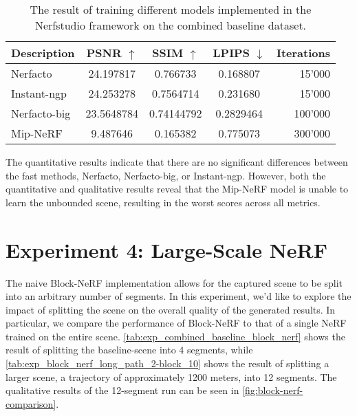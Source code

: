 \begin{table}[ht]
\centering
\setlength{\tabcolsep}{6pt}
\renewcommand{\arraystretch}{1.5}
\begin{tabular}{l | C{2.2} C{1.3} C{1.3} | r}
\hline
\textbf{Description} & \textbf{PSNR $\uparrow$} & \textbf{SSIM $\uparrow$} & \textbf{LPIPS $\downarrow$} & \textbf{Iterations} \\
\hline
Nerfacto        & 24.197817                     & 0.766733     & 0.168807 & 15'000 \\
Instant-ngp     & 24.253278   & 0.7564714                     & 0.231680 & 15'000 \\
Nerfacto-big    & 23.5648784     & 0.74144792     & 0.2829464 & 100'000 \\
Mip-NeRF        & 9.487646 & 0.165382 & 0.775073 & 300'000 \\
\hline
\end{tabular}
\caption[Results for experiment 3: Different models]{The result of training different models implemented in the Nerfstudio framework on the combined baseline dataset.}
\label{tab:different-models}
\end{table}



The quantitative results indicate that there are no significant differences between the fast methods, Nerfacto, Nerfacto-big, or Instant-ngp. However, both the quantitative and qualitative results reveal that the Mip-NeRF model is unable to learn the unbounded scene, resulting in the worst scores across all metrics.









\section{Experiment 4: Large-Scale NeRF}

The naive Block-NeRF implementation allows for the captured scene to be split into an arbitrary number of segments. In this experiment, we'd like to explore the impact of splitting the scene on the overall quality of the generated results. In particular, we compare the performance of Block-NeRF to that of a single NeRF trained on the entire scene. \autoref{tab:exp_combined_baseline_block_nerf} shows the result of splitting the baseline-scene into 4 segments, while \autoref{tab:exp_block_nerf_long_path_2-block_10} shows the result of splitting a larger scene, a trajectory of approximately 1200 meters, into 12 segments. The qualitative results of the 12-segment run can be seen in \autoref{fig:block-nerf-comparison}.

